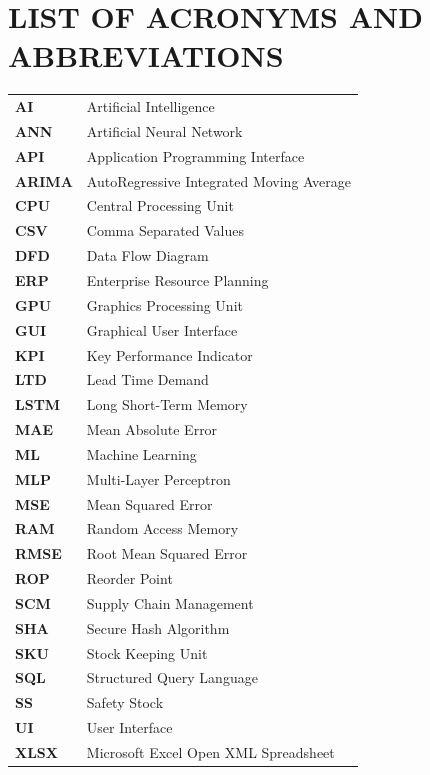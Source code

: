 \documentclass[12pt,a4paper]{report}
\begin{document}
\chapter*{LIST OF ACRONYMS AND ABBREVIATIONS}
\begin{tabular}{ll}
\textbf{AI} & Artificial Intelligence \\
\textbf{ANN} & Artificial Neural Network \\
\textbf{API} & Application Programming Interface \\
\textbf{ARIMA} & AutoRegressive Integrated Moving Average \\
\textbf{CPU} & Central Processing Unit \\
\textbf{CSV} & Comma Separated Values \\
\textbf{DFD} & Data Flow Diagram \\
\textbf{ERP} & Enterprise Resource Planning \\
\textbf{GPU} & Graphics Processing Unit \\
\textbf{GUI} & Graphical User Interface \\
\textbf{KPI} & Key Performance Indicator \\
\textbf{LTD} & Lead Time Demand \\
\textbf{LSTM} & Long Short-Term Memory \\
\textbf{MAE} & Mean Absolute Error \\
\textbf{ML} & Machine Learning \\
\textbf{MLP} & Multi-Layer Perceptron \\
\textbf{MSE} & Mean Squared Error \\
\textbf{RAM} & Random Access Memory \\
\textbf{RMSE} & Root Mean Squared Error \\
\textbf{ROP} & Reorder Point \\
\textbf{SCM} & Supply Chain Management \\
\textbf{SHA} & Secure Hash Algorithm \\
\textbf{SKU} & Stock Keeping Unit \\
\textbf{SQL} & Structured Query Language \\
\textbf{SS} & Safety Stock \\
\textbf{UI} & User Interface \\
\textbf{XLSX} & Microsoft Excel Open XML Spreadsheet \\
\end{tabular}
\end{document}
